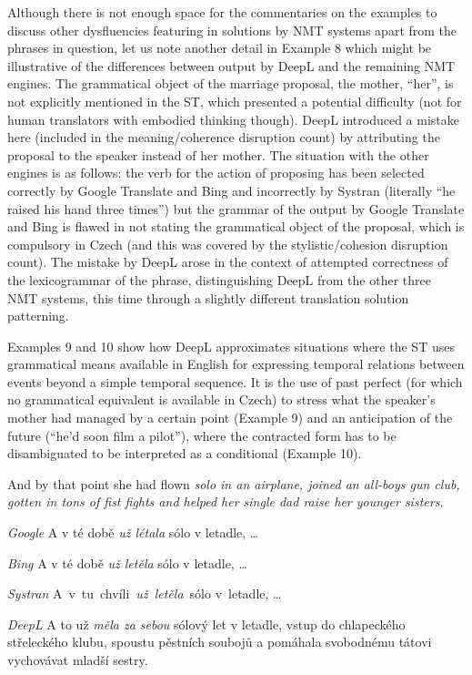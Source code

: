 \documentclass[output=paper]{langscibook}
\begin{document}
Although there is not enough space for the commentaries on the examples to discuss other dysfluencies featuring in solutions by NMT systems apart from the phrases in question, let us note another detail in Example 8 which might be illustrative of the differences between output by DeepL and the remaining NMT engines. The grammatical object of the marriage proposal, the mother, “her”, is not explicitly mentioned in the ST, which presented a potential difficulty (not for human translators with embodied thinking though). DeepL introduced a mistake here (included in the meaning/coherence disruption count) by attributing the proposal to the speaker instead of her mother. The situation with the other engines is as follows: the verb for the action of proposing has been selected correctly by Google Translate and Bing and incorrectly by Systran (literally “he raised his hand three times”) but the grammar of the output by Google Translate and Bing is flawed in not stating the grammatical object of the proposal, which is compulsory in Czech (and this was covered by the stylistic/cohesion disruption count). The mistake by DeepL arose in the context of attempted correctness of the lexicogrammar of the phrase, distinguishing DeepL from the other three NMT systems, this time through a slightly different translation solution patterning.

Examples 9 and 10 show how DeepL approximates situations where the ST uses grammatical means available in English for expressing temporal relations between events beyond a simple temporal sequence. It is the use of past perfect (for which no grammatical equivalent is available in Czech) to stress what the speaker’s mother had managed by a certain point (Example 9) and an anticipation of the future (“he’d soon film a pilot”), where the contracted form has to be disambiguated to be interpreted as a conditional (Example 10).

\ea \label{ex:kamenicka:5}

And by that point she had flown \textit{solo in an airplane, joined an all-boys gun club, gotten in tons of fist fights and helped her single dad raise her younger sisters.}

\textit{Google} A v té době \textit{už létala} sólo v letadle, …

\textit{Bing} A v té době \textit{už letěla} sólo v letadle, …

\textit{Systran} A~v~tu~chvíli~\textit{už~letěla}~sólo v~letadle, …

\textit{DeepL} A to už \textit{měla za sebou} sólový let v letadle, vstup do chlapeckého střeleckého klubu, spoustu pěstních soubojů a pomáhala svobodnému tátovi vychovávat mladší sestry.
\end{document}
